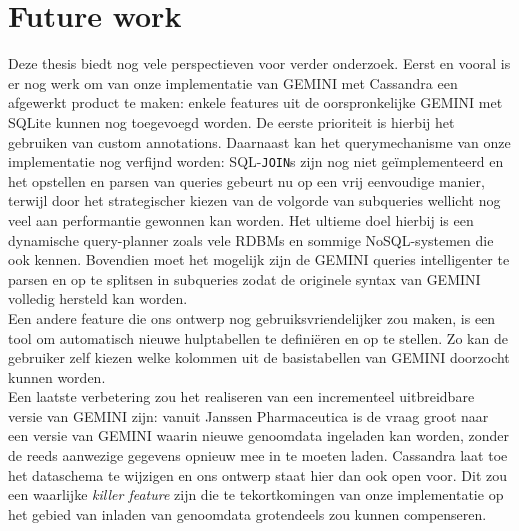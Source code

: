 \chapter{Future work}

Deze thesis biedt nog vele perspectieven voor verder onderzoek. Eerst en vooral is er nog werk om van onze implementatie van GEMINI met Cassandra een afgewerkt product te maken: enkele features uit de oorspronkelijke GEMINI met SQLite kunnen nog toegevoegd worden. De eerste prioriteit is hierbij het gebruiken van custom annotations. Daarnaast kan het querymechanisme van onze implementatie nog verfijnd worden: SQL-\texttt{JOIN}s zijn nog niet ge\"implementeerd en het opstellen en parsen van queries gebeurt nu op een vrij eenvoudige manier, terwijl door het strategischer kiezen van de volgorde van subqueries wellicht nog veel aan performantie gewonnen kan worden. Het ultieme doel hierbij is een dynamische query-planner zoals vele RDBMs en sommige NoSQL-systemen die ook kennen. Bovendien moet het mogelijk zijn de GEMINI queries intelligenter te parsen en op te splitsen in subqueries zodat de originele syntax van GEMINI volledig hersteld kan worden.\\
Een andere feature die ons ontwerp nog gebruiksvriendelijker zou maken, is een tool om automatisch nieuwe hulptabellen te defini\"eren en op te stellen. Zo kan de gebruiker zelf kiezen welke kolommen uit de basistabellen van GEMINI doorzocht kunnen worden.\\
Een laatste verbetering zou het realiseren van een incrementeel uitbreidbare versie van GEMINI zijn: vanuit Janssen Pharmaceutica is de vraag groot naar een versie van GEMINI waarin nieuwe genoomdata ingeladen kan worden, zonder de reeds aanwezige gegevens opnieuw mee in te moeten laden. Cassandra laat toe het dataschema te wijzigen en ons ontwerp staat hier dan ook open voor. Dit zou een waarlijke \textit{killer feature} zijn die te tekortkomingen van onze implementatie op het gebied van inladen van genoomdata grotendeels zou kunnen compenseren.\\

